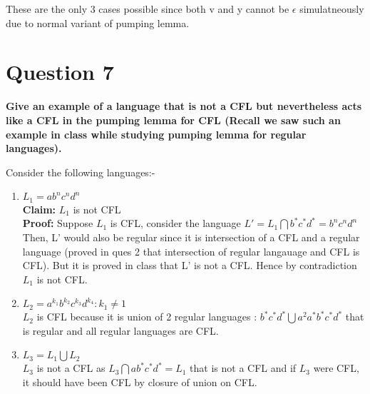 \documentclass{article}
\begin{document}
These are the only 3 cases possible since both v and y cannot be $\epsilon $ simulatneously due to normal variant of pumping lemma.\\

\pagebreak


\section{Question 7}
\textbf{Give an example of a language that is not a CFL but nevertheless acts like a CFL in the pumping lemma for CFL (Recall we saw such an example in class while studying pumping lemma for regular languages). }

Consider the following languages:-\\
\begin{enumerate}
    \item $L_1 = ab^nc^nd^n$\\
        \textbf{Claim: }$L_1$ is not CFL\\
        \textbf{Proof: }Suppose $L_1$ is CFL, consider the language $L' = L_1 \bigcap b^*c^*d^* = b^nc^nd^n$\\
        Then, L' would also be regular since it is intersection of a CFL and a regular language (proved in ques 2 that intersection
        of regular langauage and CFL is CFL). But it is proved in class that L' is not a CFL. 
        Hence by contradiction $L_1$ is not CFL. 
    \item $L_2 = a^{k_1}b^{k_2}c^{k_3}d^{k_4} : k_1 \neq 1$\\
        $L_2$ is CFL because it is union of 2 regular languages : $b^*c^*d^* \bigcup a^2a^*b^*c^*d^*$ that is regular and all regular languages are CFL.
    \item $L_3 = L_1 \bigcup L_2$ \\
        $L_3$ is not a CFL as $L_3 \bigcap ab^*c^*d^* = L_1$ that is not a CFL and if $L_3$ were CFL, it should have been CFL by closure of union on CFL.
\end{enumerate}
\end{document}
